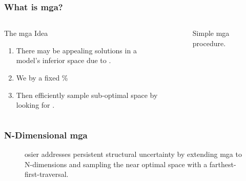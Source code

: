 \begin{frame}
    \frametitle{What is \gls{mga}?}

    \begin{columns}
        \column[t]{3.5cm}
        \begin{block}{The \gls{mga} Idea}
            \begin{enumerate}[<+->]
                \item There may be appealing solutions in a model's inferior
                space due to .
                \item We  by a fixed \% 
                \item Then efficiently sample sub-optimal space by looking for
                 \cite{decarolis_using_2011}.
            \end{enumerate}    
        \end{block}
    \column[t]{7cm}
        \begin{figure}
            \centering
            \resizebox{\columnwidth}{!}{}
            \caption{Simple \gls{mga} procedure.}
        \end{figure}
    \end{columns}
\end{frame}

\begin{frame}
    \frametitle{N-Dimensional \gls{mga}}
    \begin{figure}
        \centering
        \resizebox{\columnwidth}{!}{}
        \caption{\gls{osier} addresses persistent structural uncertainty by
        extending \gls{mga} to N-dimensions and sampling the near optimal space
        with a farthest-first-traversal.}
    \end{figure}
\end{frame}

